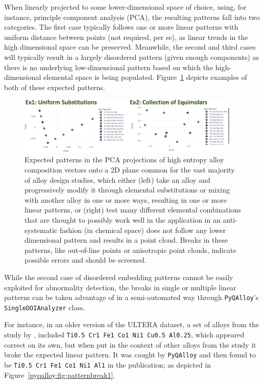 When linearly projected to some lower-dimensional space of choice, using, for instance, principle component analysis (PCA), the resulting patterns fall into two categories. The first case typically follows one or more linear patterns with uniform distance between points (not required, per se), as linear trends in the high dimensional space can be preserved. Meanwhile, the second and third cases will typically result in a largely disordered pattern (given enough components) as there is no underlying low-dimensional pattern based on which the high-dimensional elemental space is being populated. Figure~\ref{pyqalloy:fig:expectedpatterns} depicts examples of both of these expected patterns.

\begin{figure}[H]
    \centering
    \includegraphics[width=0.95\textwidth]{pyqalloy/pyqalloy_ExpectedPCAPatterns.png}
    \caption{Expected patterns in the PCA projections of high entropy alloy composition vectors onto a 2D plane common for the vast majority of alloy design studies, which either (left) take an alloy and progressively modify it through elemental substitutions or mixing with another alloy in one or more ways, resulting in one or more linear patterns, or (right) test many different elemental combinations that are thought to possibly work well in the application in an anti-systematic fashion (in chemical space) does not follow any lower dimensional pattern and results in a point cloud. Breaks in these patterns, like out-of-line points or anisotropic point clouds, indicate possible errors and should be screened.}
    \label{pyqalloy:fig:expectedpatterns}
\end{figure}

While the second case of disordered embedding patterns cannot be easily exploited for abnormality detection, the breaks in single or multiple linear patterns can be taken advantage of in a semi-automated way through \texttt{PyQAlloy}'s \texttt{SingleDOIAnalyzer} class.

For instance, in an older version of the ULTERA dataset, a set of alloys from the study by \citet{Wang2009AtomicAlloy}, included \texttt{Ti0.5 Cr1 Fe1 Co1 Ni1 Cu0.5 Al0.25}, which appeared correct on its own, but when put in the context of other alloys from the study it broke the expected linear pattern. It was caught by \texttt{PyQAlloy} and then found to be \texttt{Ti0.5 Cr1 Fe1 Co1 Ni1 Al1} in the publication; as depicted in Figure~\ref{pyqalloy:fig:patternbreak1}.


